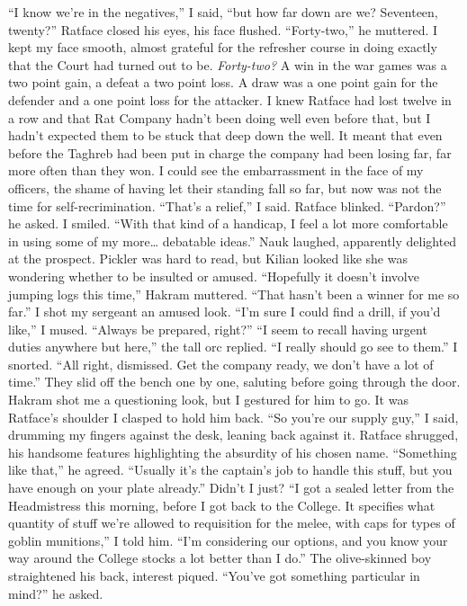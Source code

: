 \documentclass[12pt, openany]{book}
\begin{document}
“I know we’re in the negatives,” I said, “but how far down are we? Seventeen, twenty?”
Ratface closed his eyes, his face flushed.
“Forty-two,” he muttered.
I kept my face smooth, almost grateful for the refresher course in doing exactly that the Court had turned out to be. \textit{Forty-two?} A win in the war games was a two point gain, a defeat a two point loss. A draw was a one point gain for the defender and a one point loss for the attacker. I knew Ratface had lost twelve in a row and that Rat Company hadn’t been doing well even before that, but I hadn’t expected them to be stuck that deep down the well. It meant that even before the Taghreb had been put in charge the company had been losing far, far more often than they won. I could see the embarrassment in the face of my officers, the shame of having let their standing fall so far, but now was not the time for self-recrimination.
“That’s a relief,” I said.
Ratface blinked. “Pardon?” he asked.
I smiled. “With that kind of a handicap, I feel a lot more comfortable in using some of my more… debatable ideas.”
Nauk laughed, apparently delighted at the prospect. Pickler was hard to read, but Kilian looked like she was wondering whether to be insulted or amused.
“Hopefully it doesn’t involve jumping logs this time,” Hakram muttered. “That hasn’t been a winner for me so far.”
I shot my sergeant an amused look.
“I’m sure I could find a drill, if you’d like,” I mused. “Always be prepared, right?”
“I seem to recall having urgent duties anywhere but here,” the tall orc replied. “I really should go see to them.”
I snorted. “All right, dismissed. Get the company ready, we don’t have a lot of time.”
They slid off the bench one by one, saluting before going through the door. Hakram shot me a questioning look, but I gestured for him to go. It was Ratface’s shoulder I clasped to hold him back.
“So you’re our supply guy,” I said, drumming my fingers against the desk, leaning back against it.
Ratface shrugged, his handsome features highlighting the absurdity of his chosen name.
“Something like that,” he agreed. “Usually it’s the captain’s job to handle this stuff, but you have enough on your plate already.”
Didn’t I just?
“I got a sealed letter from the Headmistress this morning, before I got back to the College. It specifies what quantity of stuff we’re allowed to requisition for the melee, with caps for types of goblin munitions,” I told him. “I’m considering our options, and you know your way around the College stocks a lot better than I do.”
The olive-skinned boy straightened his back, interest piqued.
“You’ve got something particular in mind?” he asked.
\end{document}
